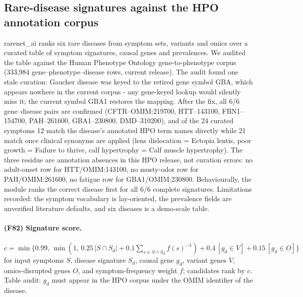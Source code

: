 \subsection{Rare-disease signatures against the HPO annotation corpus}
rarenet\_ai ranks six rare diseases from symptom sets, variants and omics over a curated table of symptom signatures, causal genes and prevalences. We audited the table against the Human Phenotype Ontology gene-to-phenotype corpus (333,984 gene--phenotype--disease rows, current release). The audit found one stale curation: Gaucher disease was keyed to the retired gene symbol GBA, which appears nowhere in the current corpus - any gene-keyed lookup would silently miss it; the current symbol GBA1 restores the mapping. After the fix, all 6/6 gene--disease pairs are confirmed (CFTR--OMIM:219700, HTT--143100, FBN1--154700, PAH--261600, GBA1--230800, DMD--310200), and of the 24 curated symptoms 12 match the disease's annotated HPO term names directly while 21 match once clinical synonyms are applied (lens dislocation = Ectopia lentis, poor growth = Failure to thrive, calf hypertrophy = Calf muscle hypertrophy). The three residue are annotation absences in this HPO release, not curation errors: no adult-onset row for HTT/OMIM:143100, no musty-odor row for PAH/OMIM:261600, no fatigue row for GBA1/OMIM:230800. Behaviourally, the module ranks the correct disease first for all 6/6 complete signatures. Limitations recorded: the symptom vocabulary is lay-oriented, the prevalence fields are unverified literature defaults, and six diseases is a demo-scale table.
\paragraph{(F82) Signature score.} $c=\min\{0.99,\,\min(1,\,0.25\,|S\cap S_d|+0.1\sum_{s\in S\cap S_d}f(s)^{-1})+0.4\,[g_d\in V]+0.15\,[g_d\in O]\}$ for input symptoms $S$, disease signature $S_d$, causal gene $g_d$, variant genes $V$, omics-disrupted genes $O$, and symptom-frequency weight $f$; candidates rank by $c$. Table audit: $g_d$ must appear in the HPO corpus under the OMIM identifier of the disease.
